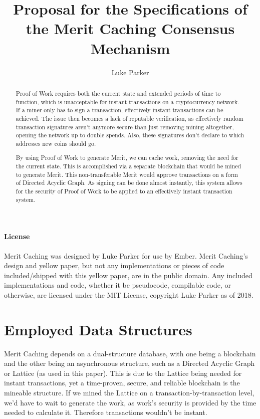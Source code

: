 \documentclass[14pt]{article}
\title{Proposal for the Specifications of the Merit Caching Consensus Mechanism}
\author{Luke Parker}
\begin{document}
\maketitle

\label{sec:abstract}
\begin{abstract}
Proof of Work requires both the current state and extended periods of time to function, which is unacceptable for instant transactions on a cryptocurrency network. If a miner only has to sign a transaction, effectively instant transactions can be achieved. The issue then becomes a lack of reputable verification, as effectively random transaction signatures aren't anymore secure than just removing mining altogether, opening the network up to double spends. Also, these signatures don't declare to which addresses new coins should go.

By using Proof of Work to generate Merit, we can cache work, removing the need for the current state. This is accomplished via a separate blockchain that would be mined to generate Merit. This non-transferable Merit would approve transactions on a form of Directed Acyclic Graph. As signing can be done almost instantly, this system allows for the security of Proof of Work to be applied to an effectively instant transaction system.
\end{abstract}

\label{sec:license}
\paragraph{License}
Merit Caching was designed by Luke Parker for use by Ember. Merit Caching's design and yellow paper, but not any implementations or pieces of code included/shipped with this yellow paper, are in the public domain. Any included implementations and code, whether it be pseudocode, compilable code, or otherwise, are licensed under the MIT License, copyright Luke Parker as of 2018.

\newpage

\label{sec:toc}
\setcounter{tocdepth}{3}
\tableofcontents

\newpage

\label{sec:1}
\section{Employed Data Structures}
Merit Caching depends on a dual-structure database, with one being a blockchain and the other being an asynchronous structure, such as a Directed Acyclic Graph or Lattice (as used in this paper). This is due to the Lattice being needed for instant transactions, yet a time-proven, secure, and reliable blockchain is the mineable structure. If we mined the Lattice on a transaction-by-transaction level, we'd have to wait to generate the work, as work's security is provided by the time needed to calculate it. Therefore transactions wouldn't be instant.
\end{document}
